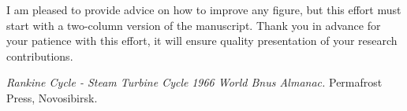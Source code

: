 \documentclass[10pt,cleanfoot]{asme2ej}
\begin{document}
I am pleased to provide advice on how to improve any figure, but this effort must start with a two-column version of the manuscript. Thank you in advance for your patience with this effort, it will ensure quality presentation of your research contributions.


\begin{thebibliography}{12}
 {\em Rankine Cycle - Steam Turbine Cycle}
{\em 1966 World Bnus Almanac.}
{Permafrost Press, Novosibirsk.}
\end{thebibliography}




\end{document}
